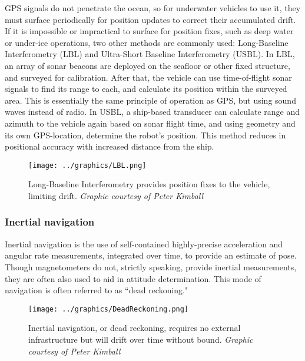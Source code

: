 GPS signals do not penetrate the ocean, so for underwater vehicles to use it, they must surface periodically for position updates to correct their accumulated drift. If it is impossible or impractical to surface for position fixes, such as deep water or under-ice operations, two other methods are commonly used: Long-Baseline Interferometry (LBL) and Ultra-Short Baseline Interferometry (USBL). In LBL, an array of sonar beacons are deployed on the seafloor or other fixed structure, and surveyed for calibration. After that, the vehicle can use time-of-flight sonar signals to find its range to each, and calculate its position within the surveyed area. This is essentially the same principle of operation as GPS, but using sound waves instead of radio. In USBL, a ship-based transducer can calculate range and azimuth to the vehicle again based on sonar flight time, and using geometry and its own GPS-location, determine the robot's position. This method reduces in positional accuracy with increased distance from the ship. 

\begin{figure}[!htb]
   \centering
   \texttt{[image: ../graphics/LBL.png]} %
   \caption{Long-Baseline Interferometry provides position fixes to the vehicle, limiting drift. \emph{Graphic courtesy of Peter Kimball}}
   \label{fig:LBL}
\end{figure}

\subsubsection{Inertial navigation}

Inertial navigation is the use of self-contained highly-precise acceleration and angular rate measurements, integrated over time, to provide an estimate of pose. Though magnetometers do not, strictly speaking, provide inertial measurements, they are often also used to aid in attitude determination. This mode of navigation is often referred to as ``dead reckoning."

\begin{figure}[!htb]
   \centering
   \texttt{[image: ../graphics/DeadReckoning.png]} %
   \caption{Inertial navigation, or dead reckoning, requires no external infrastructure but will drift over time without bound. \emph{Graphic courtesy of Peter Kimball}}
   \label{fig:inertialNav}
\end{figure}


